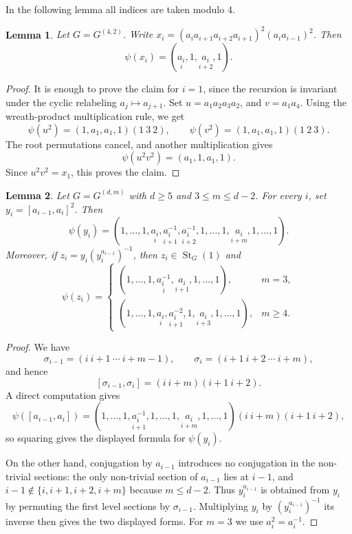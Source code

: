 \documentclass[11pt,leqno]{amsart}
\theoremstyle{plain}
\newtheorem{lemma}[lemma]{Lemma}
\DeclareMathOperator{\St}{St}
\numberwithin{equation}{section}
\begin{document}
In the following lemma all indices are taken modulo $4$.
\begin{lemma}\label{lem:smallsupport42}
	Let $G=G^{(4,2)}$. Write $x_i=(a_i a_{i+1}a_{i+2}a_{i+1})^2(a_i a_{i-1})^2$. Then
    \[
	\psi(x_i)=(\underset{i}{a_i},1,
	\underset{i+2}{a_i},1).
	\]
\end{lemma}

\begin{proof}
	It is enough to prove the claim for $i=1$, since the recursion is invariant under the cyclic relabeling $a_j\mapsto a_{j+1}$. Set $	u=a_1a_2a_3a_2$, and  $	v=a_1a_4$. Using the wreath-product multiplication rule,
     we get
	\[
	\psi(u^2)=(1,a_1,a_1,1)(1\ 3\ 2),
	\qquad
	\psi(v^2)=(1,a_1,a_1,1)(1\ 2\ 3).
	\]
	The root permutations cancel, and another multiplication gives
	\[
	\psi(u^2v^2)=(a_1,1,a_1,1).
	\]
	Since $u^2v^2=x_1$, this proves the claim.
\end{proof}

\begin{lemma}\label{lem:sections-middle}
	Let $G=G^{(d,m)}$ with $d\geq 5$ and $3\leq m\leq d-2$. For every $i$, set $	y_i=[a_{i-1},a_i]^2$. Then
	\[
	\psi(y_i)=
	(1,\ldots,1,
	\underset{i}{a_i},
	\underset{i+1}{a_i^{-1}},
	\underset{i+2}{a_i^{-1}},
	1,\ldots,1,
	\underset{i+m}{a_i},
	1,\ldots,1).
	\]
	Moreover, if $z_i=y_i(y_i^{a_{i-1}})^{-1}$, then $z_i\in\St_G(1)$ and
	\[
	\psi(z_i)=
	\begin{cases}
		(1,\ldots,1,\underset{i}{a_i^{-1}},
		\underset{i+1}{a_i},1,\ldots,1), & m=3,\\[4pt]
		(1,\ldots,1,\underset{i}{a_i},
		\underset{i+1}{a_i^{-2}},1,
		\underset{i+3}{a_i},1,\ldots,1), & m\geq 4.
	\end{cases}
	\]
\end{lemma}

\begin{proof}
	We have
	\[
	\sigma_{i-1}=(i\ i+1\ \cdots\ i+m-1),
	\qquad
	\sigma_i=(i+1\ i+2\ \cdots\ i+m),
	\]
	and hence
	\[
	[\sigma_{i-1},\sigma_i]=(i\ i+m)(i+1\ i+2).
	\]
	A direct computation gives
	\[
	\psi([a_{i-1},a_i])
	=(1,\ldots,1,
	\underset{i+1}{a_i^{-1}},
	1,\ldots,1,
	\underset{i+m}{a_i},
	1,\ldots,1)(i\ i+m)(i+1\ i+2),
	\]
	so squaring gives the displayed formula for $\psi(y_i)$.
	
	On the other hand, conjugation by $a_{i-1}$ introduces no conjugation in the non-trivial sections: the only non-trivial section of $a_{i-1}$ lies at $i-1$, and $i-1\notin\{i,i+1,i+2,i+m\}$ because $m\leq d-2$. Thus $y_i^{a_{i-1}}$ is obtained from $y_i$ by permuting the first level sections by $\sigma_{i-1}$. Multiplying $y_i$ by $(y_i^{a_{i-1}})^{-1}$ its inverse then gives the two displayed forms. For $m=3$ we use $a_i^2=a_i^{-1}$.
\end{proof}
\end{document}
